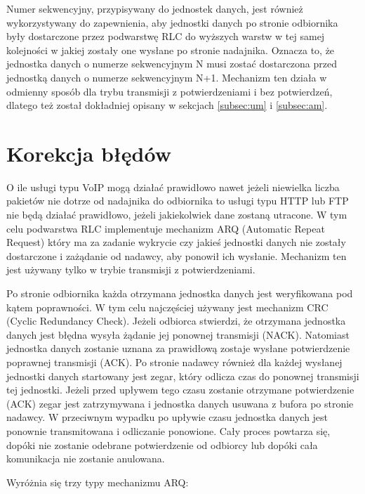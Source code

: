 Numer sekwencyjny, przypisywany do jednostek danych, jest również wykorzystywany do zapewnienia, aby jednostki danych po stronie odbiornika były dostarczone przez podwarstwę RLC do wyższych warstw w tej samej kolejności w jakiej zostały one wysłane po stronie nadajnika. Oznacza to, że jednostka danych o numerze sekwencyjnym N musi zostać dostarczona przed jednostką danych o numerze sekwencyjnym N+1. Mechanizm ten działa w odmienny sposób dla trybu transmisji z potwierdzeniami i bez potwierdzeń, dlatego też został dokładniej opisany w sekcjach \ref{subsec:um} i \ref{subsec:am}.

\section{Korekcja błędów}

O ile usługi typu VoIP mogą działać prawidłowo nawet jeżeli niewielka liczba pakietów nie dotrze od nadajnika do odbiornika to usługi typu HTTP lub FTP nie będą działać prawidłowo, jeżeli jakiekolwiek dane zostaną utracone. W tym celu podwarstwa RLC implementuje mechanizm ARQ (Automatic Repeat Request) który ma za zadanie wykrycie czy jakieś jednostki danych nie zostały dostarczone i zażądanie od nadawcy, aby ponowił ich wysłanie. Mechanizm ten jest używany tylko w trybie transmisji z potwierdzeniami.

Po stronie odbiornika każda otrzymana jednostka danych jest weryfikowana pod kątem poprawności. W tym celu najczęściej używany jest mechanizm CRC (Cyclic Redundancy Check). Jeżeli odbiorca stwierdzi, że otrzymana jednostka danych jest błędna wysyła żądanie jej ponownej transmisji (NACK). Natomiast jednostka danych zostanie uznana za prawidłową zostaje wysłane potwierdzenie poprawnej transmisji (ACK). Po stronie nadawcy również dla każdej wysłanej jednostki danych startowany jest zegar, który odlicza czas do ponownej transmisji tej jednostki. Jeżeli przed upływem tego czasu zostanie otrzymane potwierdzenie (ACK) zegar jest zatrzymywana i jednostka danych usuwana z bufora po stronie nadawcy. W przeciwnym wypadku po upływie czasu jednostka danych jest ponownie transmitowana i odliczanie ponowione. Cały proces powtarza się, dopóki nie zostanie odebrane potwierdzenie od odbiorcy lub dopóki cała komunikacja nie zostanie anulowana.


Wyróżnia się trzy typy mechanizmu ARQ:

